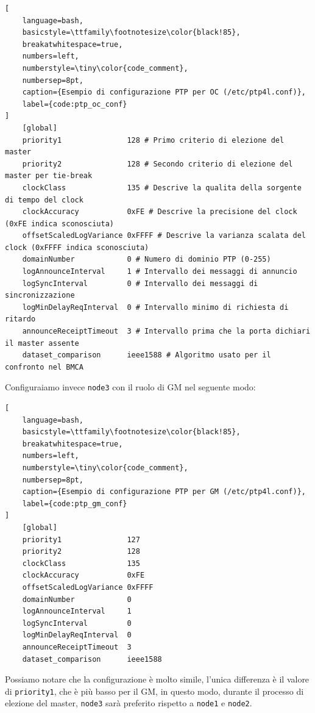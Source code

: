 \documentclass[12pt,a4paper,twoside]{book}
\begin{document}
\begin{onehalfspace}
\begin{lstlisting}[
    language=bash,
    basicstyle=\ttfamily\footnotesize\color{black!85},
    breakatwhitespace=true,
    numbers=left,
    numberstyle=\tiny\color{code_comment},
    numbersep=8pt,
    caption={Esempio di configurazione PTP per OC (/etc/ptp4l.conf)},
    label={code:ptp_oc_conf}
]
    [global]
    priority1               128 # Primo criterio di elezione del master
    priority2               128 # Secondo criterio di elezione del master per tie-break
    clockClass              135 # Descrive la qualita della sorgente di tempo del clock
    clockAccuracy           0xFE # Descrive la precisione del clock (0xFE indica sconosciuta)
    offsetScaledLogVariance 0xFFFF # Descrive la varianza scalata del clock (0xFFFF indica sconosciuta)
    domainNumber            0 # Numero di dominio PTP (0-255)
    logAnnounceInterval     1 # Intervallo dei messaggi di annuncio 
    logSyncInterval         0 # Intervallo dei messaggi di sincronizzazione 
    logMinDelayReqInterval  0 # Intervallo minimo di richiesta di ritardo 
    announceReceiptTimeout  3 # Intervallo prima che la porta dichiari il master assente
    dataset_comparison      ieee1588 # Algoritmo usato per il confronto nel BMCA
\end{lstlisting}



Configuraiamo invece  \texttt{node3} con il ruolo di GM nel seguente modo:

\begin{lstlisting}[
    language=bash,
    basicstyle=\ttfamily\footnotesize\color{black!85},
    breakatwhitespace=true,
    numbers=left,
    numberstyle=\tiny\color{code_comment},
    numbersep=8pt,
    caption={Esempio di configurazione PTP per GM (/etc/ptp4l.conf)},
    label={code:ptp_gm_conf}
]
    [global]
    priority1               127
    priority2               128
    clockClass              135
    clockAccuracy           0xFE
    offsetScaledLogVariance 0xFFFF
    domainNumber            0
    logAnnounceInterval     1
    logSyncInterval         0
    logMinDelayReqInterval  0
    announceReceiptTimeout  3
    dataset_comparison      ieee1588
\end{lstlisting}

Possiamo notare che la configurazione è molto simile, l'unica differenza è il valore di \texttt{priority1}, che è più basso per il GM, in questo modo, durante il processo di elezione del master, \texttt{node3} sarà preferito rispetto a \texttt{node1} e \texttt{node2}.


\end{onehalfspace}
\end{document}
